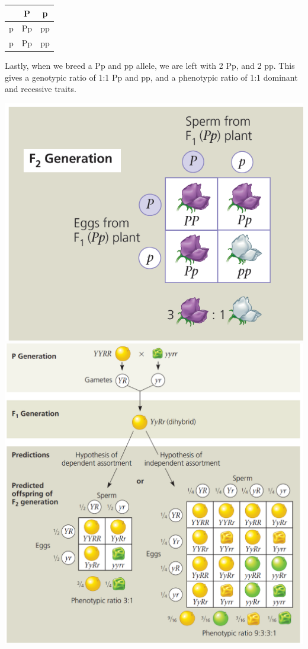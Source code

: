 \documentclass{article}
\begin{document}
\begin{center}
    \begin{tabular}{ c | c | c }
      & P & p \\ 
      \hline
     p & Pp & pp \\
     \hline  
     p & Pp & pp    
    \end{tabular}
\end{center}

Lastly, when we breed a Pp and pp allele, we are left with 2 Pp, and 2 pp. This gives a genotypic ratio of 1:1 Pp and pp, and a phenotypic ratio of 1:1 dominant and recessive traits.

\includegraphics*[scale=0.9]{square.png}
\break
\includegraphics*[scale=0.6]{square2.png}
\end{document}
